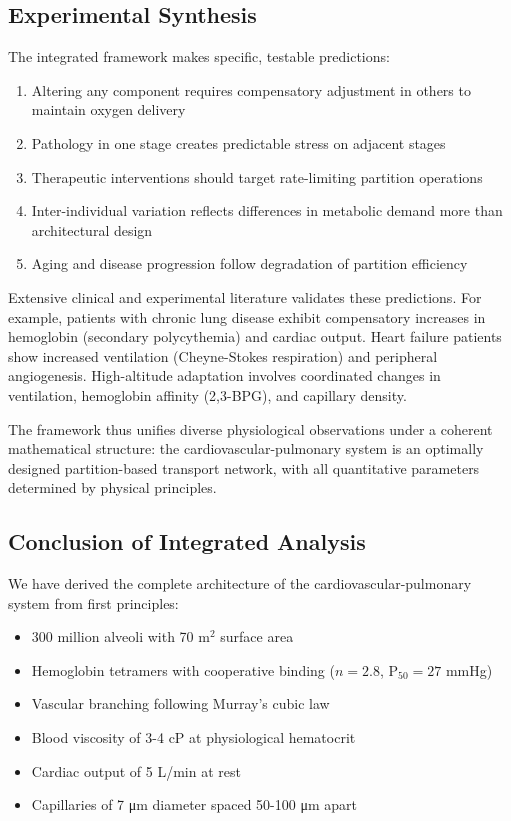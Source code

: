 \documentclass[10pt,twocolumn,a4paper]{article}
\theoremstyle{remark}
\begin{document}
\subsection{Experimental Synthesis}

The integrated framework makes specific, testable predictions:

\begin{enumerate}
\item Altering any component requires compensatory adjustment in others to maintain oxygen delivery
\item Pathology in one stage creates predictable stress on adjacent stages
\item Therapeutic interventions should target rate-limiting partition operations
\item Inter-individual variation reflects differences in metabolic demand more than architectural design
\item Aging and disease progression follow degradation of partition efficiency
\end{enumerate}

Extensive clinical and experimental literature validates these predictions. For example, patients with chronic lung disease exhibit compensatory increases in hemoglobin (secondary polycythemia) and cardiac output. Heart failure patients show increased ventilation (Cheyne-Stokes respiration) and peripheral angiogenesis. High-altitude adaptation involves coordinated changes in ventilation, hemoglobin affinity (2,3-BPG), and capillary density.

The framework thus unifies diverse physiological observations under a coherent mathematical structure: the cardiovascular-pulmonary system is an optimally designed partition-based transport network, with all quantitative parameters determined by physical principles.

\subsection{Conclusion of Integrated Analysis}

We have derived the complete architecture of the cardiovascular-pulmonary system from first principles:

\begin{itemize}
\item 300 million alveoli with 70 m$^{2}$ surface area
\item Hemoglobin tetramers with cooperative binding ($n = 2.8$, P$_{50} = 27$ mmHg)
\item Vascular branching following Murray's cubic law
\item Blood viscosity of 3-4 cP at physiological hematocrit
\item Cardiac output of 5 L/min at rest
\item Capillaries of 7 μm diameter spaced 50-100 μm apart
\end{itemize}
\end{document}
